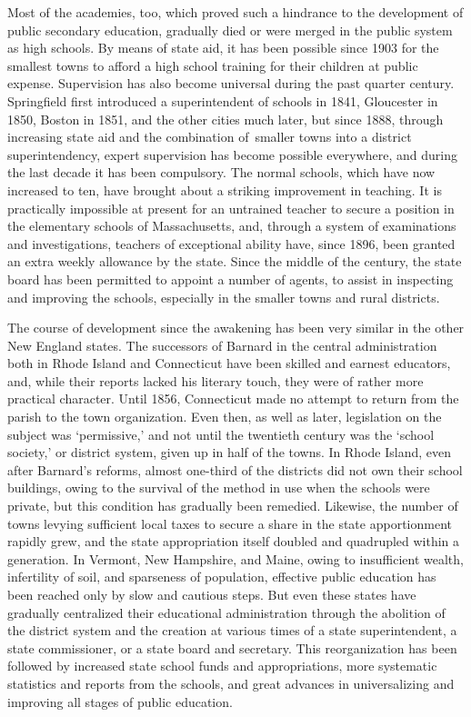\documentclass[
]{book}
\begin{document}
Most of the academies, too, which proved such a hindrance to the development of public secondary education, gradually died or were merged in the public system as high schools. By means of state aid, it has been possible since 1903 for the smallest towns to afford a high school training for their children at public expense. Supervision has also become universal during the past quarter century. Springfield first introduced a superintendent of schools in 1841, Gloucester in 1850, Boston in 1851, and the other cities much later, but since 1888, through increasing state aid and the combination of~smaller towns into a district superintendency, expert supervision has become possible everywhere, and during the last decade it has been compulsory. The normal schools, which have now increased to ten, have brought about a striking improvement in teaching. It is practically impossible at present for an untrained teacher to secure a position in the elementary schools of Massachusetts, and, through a system of examinations and investigations, teachers of exceptional ability have, since 1896, been granted an extra weekly allowance by the state. Since the middle of the century, the state board has been permitted to appoint a number of agents, to assist in inspecting and improving the schools, especially in the smaller towns and rural districts.

The course of development since the awakening has been very similar in the other New England states. The successors of Barnard in the central administration both in Rhode Island and Connecticut have been skilled and earnest educators, and, while their reports lacked his literary touch, they were of rather more practical character. Until 1856, Connecticut made no attempt to return from the parish to the town organization. Even then, as well as later, legislation on the subject was `permissive,' and not until the twentieth century was the `school society,' or district system, given up in half of the towns. In Rhode Island, even after Barnard's reforms, almost one-third of the districts did not own their school buildings, owing to the survival of the method in use when the schools were private, but this condition has gradually been remedied. Likewise, the number of towns levying sufficient local taxes to secure a share in the state apportionment rapidly grew, and the state appropriation itself doubled and quadrupled within a generation. In Vermont, New Hampshire, and Maine, owing to insufficient wealth, infertility of soil, and sparseness of population, effective public education has been reached only by slow and cautious steps. But even these states have gradually centralized their educational administration through the abolition of the district system and the creation at various times of a state superintendent, a state commissioner, or a state board and secretary. This reorganization has been followed by increased state school funds and appropriations, more systematic statistics and reports from the schools, and great advances in universalizing and improving all stages of public education.
\end{document}
